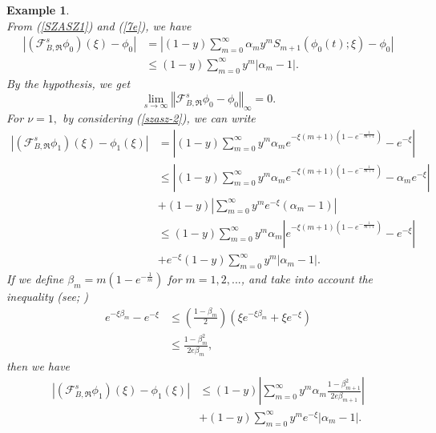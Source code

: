 \documentclass{amsart}
\theoremstyle{plain}
\newtheorem{example}{Example}
\numberwithin{equation}{section}
\begin{document}
\begin{example}
\begin{equation}
\end{equation}
From (\ref{SZASZ1}) and (\ref{7e}), we have%
\begin{align*}
\left \vert (\mathcal{F}_{B,\Re}^{s}\phi_{0})(\xi)-\phi_{0}\right \vert  &
=\left \vert (1-y)\sum_{m=0}^{\infty}\alpha_{m}y^{m}S_{m+1}(\phi_{0}%
(t);\xi)-\phi_{0}\right \vert \\
&  \leq(1-y)\sum_{m=0}^{\infty}y^{m}\left \vert \alpha_{m}-1\right \vert .
\end{align*}
By the hypothesis, we get%
\[
\lim_{s\rightarrow \infty}\left \Vert \mathcal{F}_{B,\Re}^{s}\phi_{0}-\phi
_{0}\right \Vert _{\infty}=0.
\]
For $\nu=1,$ by considering (\ref{szasz-2}), we can write%
\begin{align}
\left \vert \left(  \mathcal{F}_{B,\Re}^{s}\phi_{1}\right)  \left(  \xi \right)
-\phi_{1}\left(  \xi \right)  \right \vert  &  =\left \vert (1-y)\sum
_{m=0}^{\infty}y^{m}\alpha_{m}e^{-\xi \left(  m+1\right)  (1-e^{-\frac{1}{m+1}%
})}-e^{-\xi}\right \vert \nonumber \\
&  \leq \left \vert (1-y)\sum_{m=0}^{\infty}y^{m}\alpha_{m}e^{-\xi \left(
m+1\right)  (1-e^{-\frac{1}{m+1}})}-\alpha_{m}e^{-\xi}\right \vert \nonumber \\
&  +(1-y)\left \vert \sum_{m=0}^{\infty}y^{m}e^{-\xi}\left(  \alpha
_{m}-1\right)  \right \vert \nonumber \\
&  \leq(1-y)\sum_{m=0}^{\infty}y^{m}\alpha_{m}\left \vert e^{-\xi \left(
m+1\right)  (1-e^{-\frac{1}{m+1}})}-e^{-\xi}\right \vert \nonumber \\
&  +e^{-\xi}(1-y)\sum_{m=0}^{\infty}y^{m}\left \vert \alpha_{m}-1\right \vert
.\label{7f}%
\end{align}
If we define $\beta_{m}=m(1-e^{-\frac{1}{m}})$ for $m=1,2,...$, and take into
account the inequality (see; \cite{holhos2018} )%
\begin{align}
e^{-\xi \beta_{m}}-e^{-\xi} &  \leq \left(  \frac{1-\beta_{m}}{2}\right)
\left(  \xi e^{-\xi \beta_{m}}+\xi e^{-\xi}\right)  \nonumber \\
&  \leq \frac{1-\beta_{m}^{2}}{2e\beta_{m}},\label{7g}%
\end{align}
then we have%
\begin{align*}
\left \vert \left(  \mathcal{F}_{B,\Re}^{s}\phi_{1}\right)  \left(  \xi \right)
-\phi_{1}\left(  \xi \right)  \right \vert  &  \leq(1-y)\left \vert \sum
_{m=0}^{\infty}y^{m}\alpha_{m}\frac{1-\beta_{m+1}^{2}}{2e\beta_{m+1}%
}\right \vert \\
&  +(1-y)\sum_{m=0}^{\infty}y^{m}e^{-\xi}\left \vert \alpha_{m}-1\right \vert .

\end{align*}
\end{example}
\end{document}
